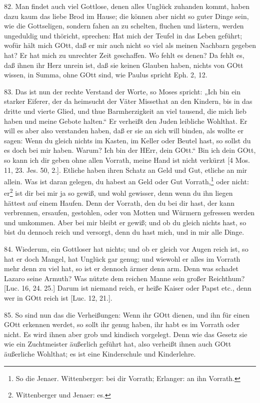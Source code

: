 82. Man findet auch viel Gottlose, denen alles Unglück zuhanden kommt, haben dazu kaum das liebe Brod im Hause; die können aber nicht so guter Dinge sein, wie die Gottseligen, sondern fahen an zu schelten, fluchen und lästern, werden ungeduldig und thöricht, sprechen: Hat mich der Teufel in das Leben geführt; wofür hält mich GOtt, daß er mir auch nicht so viel als meinen Nachbarn gegeben hat? Er hat mich zu unrechter Zeit geschaffen. Wo fehlt es denen? Da fehlt es, daß ihnen ihr Herz unrein ist, daß sie keinen Glauben haben, nichts von GOtt wissen, in Summa, ohne GOtt sind, wie Paulus spricht Eph. 2, 12.

83. Das ist nun der rechte Verstand der Worte, so Moses spricht: „Ich bin ein starker Eiferer, der da heimsucht der Väter Missethat an den Kindern, bis in das dritte und vierte Glied, und thue Barmherzigkeit an viel tausend, die mich lieb haben und meine Gebote halten.“ Er verheißt den Juden leibliche Wohlthat. Er will es aber also verstanden haben, daß er sie an sich will binden, als wollte er sagen: Wenn du gleich nichts im Kasten, im Keller oder Beutel hast, so sollst du es doch bei mir haben. Warum? Ich bin der HErr, dein GOtt.“ Bin ich dein GOtt, so kann ich dir geben ohne allen Vorrath, meine Hand ist nicht verkürzt [4 Mos. 11, 23. Jes. 50, 2.]. Etliche haben ihren Schatz an Geld und Gut, etliche an mir allein. Was ist daran gelegen, du habest an Geld oder Gut Vorrath,\footnote{So die Jenaer. Wittenberger: bei dir Vorrath; Erlanger: an ihn Vorrath.} oder nicht: er\footnote{Wittenberger und Jenaer: es.} ist dir bei mir ja so gewiß, und wohl gewisser, denn wenn du ihn liegen hättest auf einem Haufen. Denn der Vorrath, den du bei dir hast, der kann verbrennen, ersaufen, gestohlen, oder von Motten und Würmern gefressen werden und umkommen. Aber bei mir bleibt er gewiß; und ob du gleich nichts hast, so bist du dennoch reich und versorgt, denn du hast mich, und in mir alle Dinge.

84. Wiederum, ein Gottloser hat nichts; und ob er gleich vor Augen reich ist, so hat er doch Mangel, hat Unglück gar genug; und wiewohl er alles im Vorrath mehr denn zu viel hat, so ist er dennoch ärmer denn arm. Denn was schadet Lazaro seine Armuth? Was nützte dem reichen Manne sein großer Reichthum? [Luc. 16, 24. 25.] Darum ist niemand reich, er heiße Kaiser oder Papst etc., denn wer in GOtt reich ist [Luc. 12, 21.].

85. So sind nun das die Verheißungen: Wenn ihr GOtt dienen, und ihn für einen GOtt erkennen werdet, so sollt ihr genug haben, ihr habt es im Vorrath oder nicht. Es wird ihnen aber grob und kindisch vorgelegt. Denn wie das Gesetz sie wie ein Zuchtmeister äußerlich geführt hat, also verheißt ihnen auch GOtt äußerliche Wohlthat; es ist eine Kinderschule und Kinderlehre.

